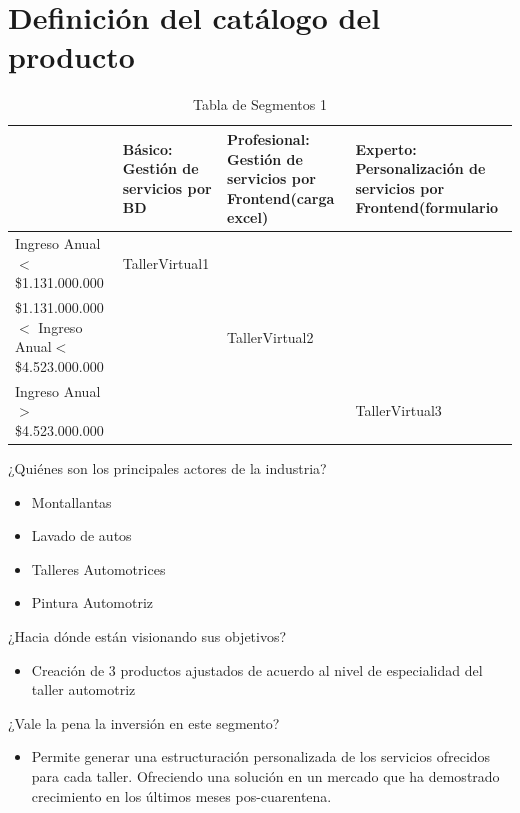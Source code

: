 \documentclass[10pt,a4paper,openany]{book}
\begin{document}
\vspace{4cm}
\section{Definición del catálogo del producto}


\begin{table}[htbp]
\centering
\begin{tabular}{|p{5cm}|p{3cm}|p{3cm}|p{3cm}|} \hline
	& \textbf{Básico:} Gestión de servicios por BD  
	& \textbf{Profesional:} Gestión de servicios por Frontend(carga excel)  
	& \textbf{Experto:} Personalización de servicios por Frontend(formulario \\[0.5ex] \hline
Ingreso Anual$<$ \$1.131.000.000	                & TallerVirtual1  &  &  \\[0.5ex] \hline
\$1.131.000.000$<$ Ingreso Anual$<$ \$4.523.000.000	&   & TallerVirtual2 &  \\[0.5ex] \hline
Ingreso Anual $>$ \$4.523.000.000	                &   &  & TallerVirtual3 \\[0.5ex] \hline

\end{tabular}
\caption{Tabla de Segmentos 1}
\label{table:t5}
\end{table}

¿Quiénes son los principales actores de la industria?
\begin{itemize}
	\item Montallantas
	\item Lavado de autos
	\item Talleres Automotrices
	\item Pintura Automotriz
\end{itemize} 

¿Hacia dónde están visionando sus objetivos?
\begin{itemize}
	\item Creación de 3  productos ajustados de acuerdo al nivel de especialidad del taller automotriz
\end{itemize} 

¿Vale la pena la inversión en este segmento?
\begin{itemize}
	\item Permite generar una estructuración personalizada de los servicios ofrecidos para cada taller. Ofreciendo una solución en un mercado que ha demostrado crecimiento en los últimos meses pos-cuarentena.
\end{itemize}
\end{document}

